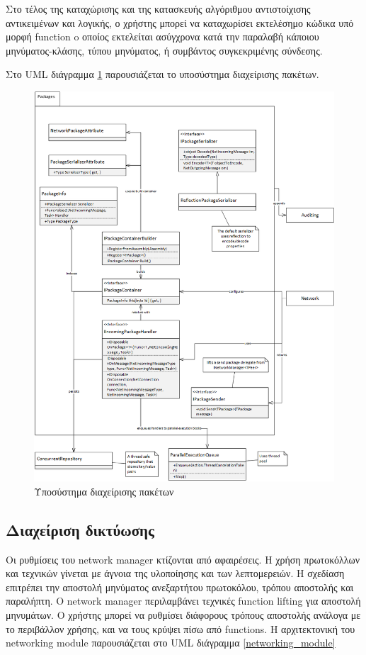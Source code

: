 			Στο τέλος της καταχώρισης και της κατασκευής αλγόριθμου αντιστοίχισης αντικειμένων και λογικής, ο χρήστης μπορεί να καταχωρίσει εκτελέσημο κώδικα υπό μορφή function o οποίος εκτελείται ασύγχρονα κατά την παραλαβή κάποιου μηνύματος-κλάσης, τύπου μηνύματος, ή συμβάντος συγκεκριμένης σύνδεσης.
			
			Στο \gls{UML} διάγραμμα \ref{network_packages} παρουσιάζεται το υποσύστημα διαχείρισης πακέτων.
			\begin{figure}
				\centering
				\includegraphics[width=165mm]{Images/network_architecture_packages}
				\caption{Υποσύστημα διαχείρισης πακέτων}
				\label{network_packages}
			\end{figure}	
					
			\subsection{Διαχείριση δικτύωσης}	 					
			
			Οι ρυθμίσεις του network manager κτίζονται από αφαιρέσεις. Η χρήση πρωτοκόλλων και τεχνικών γίνεται με άγνοια της υλοποίησης και των λεπτομερειών.
			Η σχεδίαση επιτρέπει την αποστολή μηνύματος ανεξαρτήτου πρωτοκόλου, τρόπου αποστολής και παραλήπτη. Ο network manager περιλαμβάνει τεχνικές function lifting για αποστολή μηνυμάτων. Ο χρήστης μπορεί να ρυθμίσει διάφορους τρόπους αποστολής ανάλογα με το περιβάλλον χρήσης, και να τους κρύψει πίσω από functions. Η αρχιτεκτονική του networking module παρουσιάζεται στο \gls{UML} διάγραμμα \ref{networking_module}
						
